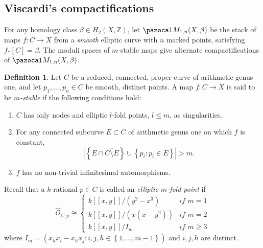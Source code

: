 \documentclass[11pt]{amsart}
\renewcommand{\to}{\rightarrow}
\theoremstyle{plain}
\theoremstyle{definition}
\newtheorem{dfn}[thm]{Definition}
\begin{document}
\subsection{Viscardi's compactifications}
For any homology class $\beta\in H_2(X,\mathbb Z)$, let $\pazocal M_{1,n}(X,\beta)$ be the stack of maps $f\colon C\to X$ from a \emph{smooth} elliptic curve with $n$ marked points, satisfying  $f_{*}\left [C\right ]=\beta$. The moduli spaces of $m$-stable maps give alternate compactifications of $\pazocal M_{1,n}(X,\beta)$.
  \begin{dfn} Let $C$ be a reduced, connected, proper curve of arithmetic genus one, and let $p_1,\dots,p_n\in C$ be smooth, distinct points. A map $f\colon C\to X$ is said to be \emph{$m$-stable} if the following conditions hold:
\begin{enumerate}
 \item $C$ has only nodes and elliptic $l$-fold points, $l\leq m$, as singularities.
 \item For any connected subcurve $E\subset C$ of arithmetic genus one on which $f$ is constant, 
 \[|\left\{E\cap \overline{C\setminus E}\right\}\cup\left\{p_i : p_i \in E\right\}| > m.\]
 \item $f$ has no non-trivial infinitesimal automorphisms.
 \end{enumerate}
\end{dfn}
Recall that a $k$-rational $p\in C$ is called an \emph{elliptic $m$-fold point} if 
\[
\hat{\mathcal{O}}_{C,p}\cong
\begin{cases}
k[[x,y]]/(y^2-x^3) & \textit{if } m=1\\
k[[x,y]]/(x(x-y^2))& \textit{if } m=2\\
k[[x,y]]/ I_m & \textit{if } m\geq 3
\end{cases}
\] 
where $I_m=(x_hx_i-x_hx_j : i,j,h\in\left\{1,\dots,m-1\right\})$ and $i,j,h$ are distinct.
\end{document}

